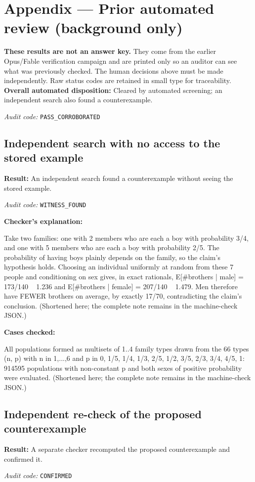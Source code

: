 \documentclass[11pt]{article}
\begin{document}
\section*{Appendix --- Prior automated review (background only)}
\textbf{These results are not an answer key.} They come from the earlier Opus/Fable verification campaign and are printed only so an auditor can see what was previously checked. The human decisions above must be made independently. Raw status codes are retained in small type for traceability.
\textbf{Overall automated disposition:} Cleared by automated screening; an independent search also found a counterexample.
\par\textit{Audit code:} \nolinkurl{PASS_CORROBORATED}
\subsection*{Independent search with no access to the stored example}
\textbf{Result:} An independent search found a counterexample without seeing the stored example.
\par\textit{Audit code:} \nolinkurl{WITNESS_FOUND}
\par\textbf{Checker's explanation:}
\begin{Vsrc}
Take two families: one with 2 members who are each a boy with probability 3/4, and one with 5 members who are each a boy with probability 2/5. The probability of having boys plainly depends on the family, so the claim's hypothesis holds. Choosing an individual uniformly at random from these 7 people and conditioning on sex gives, in exact rationals, E[#brothers | male] = 173/140 ~ 1.236 and E[#brothers | female] = 207/140 ~ 1.479. Men therefore have FEWER brothers on average, by exactly 17/70, contradicting the claim's conclusion. (Shortened here; the complete note remains in the machine-check JSON.)
\end{Vsrc}
\par\textbf{Cases checked:}
\begin{Vsrc}
All populations formed as multisets of 1..4 family types drawn from the 66 types (n, p) with n in {1,...,6} and p in {0, 1/5, 1/4, 1/3, 2/5, 1/2, 3/5, 2/3, 3/4, 4/5, 1}: 914595 populations with non-constant p and both sexes of positive probability were evaluated. (Shortened here; the complete note remains in the machine-check JSON.)
\end{Vsrc}
\subsection*{Independent re-check of the proposed counterexample}
\textbf{Result:} A separate checker recomputed the proposed counterexample and confirmed it.
\par\textit{Audit code:} \nolinkurl{CONFIRMED}
\end{document}
